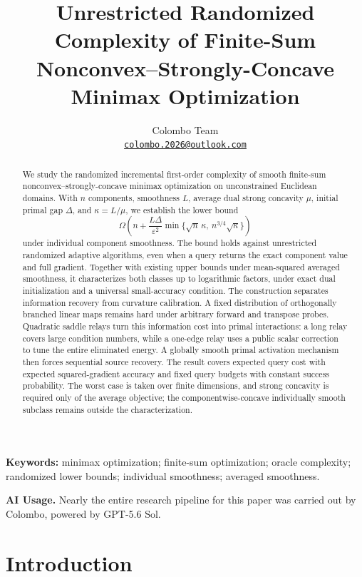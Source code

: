 \documentclass[11pt,letterpaper]{article}
\title{\bfseries Unrestricted Randomized Complexity of Finite-Sum\\
 Nonconvex--Strongly-Concave Minimax Optimization}
\author{Colombo Team\\[3pt]
 \small\href{mailto:colombo.2026@outlook.com}{\texttt{colombo.2026@outlook.com}}}
\date{}
\theoremstyle{definition}
\theoremstyle{remark}
\begin{document}
\maketitle
\thispagestyle{plain}
\begin{abstract}
We study the randomized incremental first-order complexity of smooth finite-sum
nonconvex--strongly-concave minimax optimization on unconstrained Euclidean
domains. With $n$ components, smoothness $L$, average dual strong concavity
$\mu$, initial primal gap $\Delta$, and $\kappa=L/\mu$, we establish the lower bound
\[
 \Omega\!\left(n+\frac{L\Delta}{\varepsilon^2}
 \min\{\sqrt n\,\kappa,\ n^{3/4}\sqrt\kappa\}\right)
\]
under individual component smoothness. The bound holds against unrestricted
randomized adaptive algorithms, even when a query returns the exact component
value and full gradient. Together with existing upper bounds under
mean-squared averaged smoothness, it characterizes both classes up to
logarithmic factors, under exact dual initialization and a universal
small-accuracy condition. The construction separates information recovery
from curvature calibration. A fixed distribution of orthogonally branched
linear maps remains hard under arbitrary forward and transpose probes.
Quadratic saddle relays turn this information cost into primal interactions:
a long relay covers large condition numbers, while a one-edge relay uses a
public scalar correction to tune the entire eliminated energy. A globally
smooth primal activation mechanism then forces sequential source recovery.
The result covers expected query cost with expected squared-gradient accuracy
and fixed query budgets with constant success probability. The worst case is
taken over finite dimensions, and strong concavity is required only of the
average objective; the componentwise-concave individually smooth subclass
remains outside the characterization.
\end{abstract}

\noindent\textbf{Keywords:} minimax optimization; finite-sum optimization;
oracle complexity; randomized lower bounds; individual smoothness;
averaged smoothness.

\begin{samepage}
\noindent\textbf{AI Usage.}
Nearly the entire research pipeline for this paper was carried out by
Colombo, powered by GPT-5.6 Sol.
\par
\end{samepage}

\section{Introduction}
\label{sec:introduction}
\end{document}
